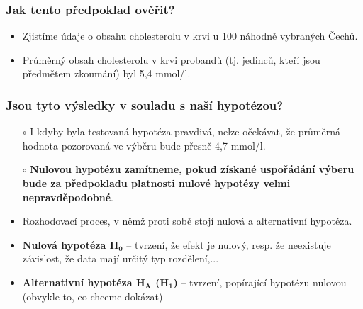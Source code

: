 \subsubsection*{Jak tento předpoklad ověřit?}
\begin{itemize}
	\item Zjistíme údaje o obsahu cholesterolu v krvi u 100 náhodně vybraných Čechů.
	\item Průměrný obsah cholesterolu v krvi probandů (tj. jedinců, kteří jsou předmětem zkoumání) byl 5,4 mmol/l.
\end{itemize}
\subsubsection*{Jsou tyto výsledky v souladu s naší hypotézou?}
\begin{itemize}
	\item[$\circ$] I kdyby byla testovaná hypotéza pravdivá, nelze očekávat, že průměrná hodnota pozorovaná ve výběru bude přesně 4,7 mmol/l.
	\item[$\circ$] \textbf{Nulovou hypotézu zamítneme, pokud získané uspořádání výberu bude za předpokladu platnosti nulové hypotézy velmi nepravděpodobné}.
\end{itemize}
\begin{itemize}
	\item Rozhodovací proces, v němž proti sobě stojí nulová a alternativní hypotéza.
	\item \textbf{Nulová hypotéza $\mathbf{H_0}$} -- tvrzení, že efekt je nulový, resp. že neexistuje závislost, že data mají určitý typ rozdělení,...
	\item \textbf{Alternativní hypotéza $\mathbf{H_A}$ ($\mathbf{H_1}$)} -- tvrzení, popírající hypotézu nulovou (obvykle to, co chceme dokázat)
\end{itemize}

